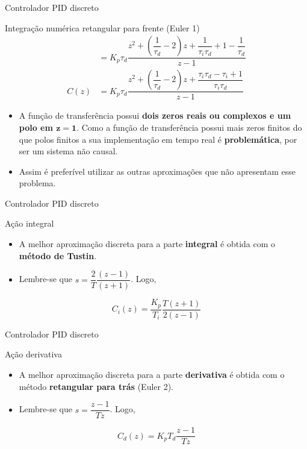 \begin{frame}{Controlador PID discreto}
\begin{block}{Integração numérica retangular para frente (Euler 1)}
		\vspace{0.1cm}
		\begin{align*}
		&=K_p\tau_d\dfrac{z^{2}+\left( \dfrac{1}{\tau_d}-2\right) z+\dfrac{1}{\tau_i\tau_d}+1-\dfrac{1}{\tau_d}}{z-1}\\
		C(z)&=K_p\tau_d\dfrac{z^{2}+\left( \dfrac{1}{\tau_d}-2\right) z+\dfrac{\tau_i\tau_d-\tau_i+1}{\tau_i\tau_d}}{z-1}
		\end{align*}
\begin{itemize}
    \item A função de transferência possui \textbf{dois zeros reais ou complexos e um polo em $ \bm{z=1} $}. Como a função de transferência possui mais zeros finitos do que polos finitos a sua implementação em tempo real é \textbf{problemática}, por ser um sistema não causal. 
    \item Assim é preferível utilizar as outras aproximações que não apresentam esse problema.
\end{itemize}
	\end{block}
\end{frame}


\begin{frame}{Controlador PID discreto}
\begin{block}{Ação integral}
\begin{itemize}
    \item A melhor aproximação discreta para a parte \textbf{integral} é obtida com o \textbf{método de Tustin}.
    \item Lembre-se que $ s=\dfrac{2}{T}\dfrac{(z-1)}{(z+1)} $. Logo,
\end{itemize}	
\[ C_i(z)=\dfrac{K_p}{T_i}\dfrac{T(z+1)}{2(z-1)} \]
\end{block}
\end{frame}


\begin{frame}{Controlador PID discreto}
\begin{block}{Ação derivativa}
\begin{itemize}
    \item A melhor aproximação discreta para a parte \textbf{derivativa} é obtida com o método \textbf{retangular para trás} (Euler 2).
    \item Lembre-se que $ s=\dfrac{z-1}{Tz} $. Logo,
\end{itemize}
\[ C_d(z)=K_pT_d\dfrac{z-1}{Tz} \]
\end{block}
\end{frame}


